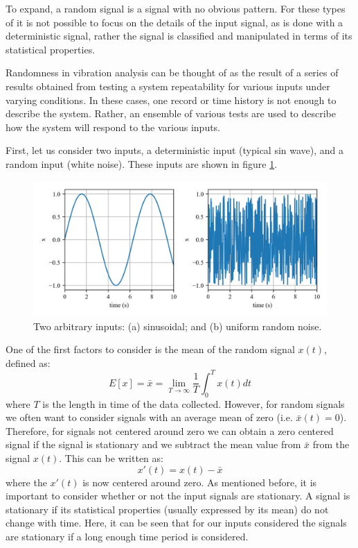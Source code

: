 \documentclass[12pt,letter]{article}
\begin{document}
To expand, a random signal is a signal with no obvious pattern. For these types of it is not possible to focus on the details of the input signal, as is done with a deterministic signal, rather the signal is classified and manipulated in terms of its statistical properties. 

Randomness in vibration analysis can be thought of as the result of a series of results obtained from testing a system repeatability for various inputs under varying conditions. In these cases, one record or time history is not enough to describe the system. Rather, an ensemble of various tests are used to describe how the system will respond to the various inputs. 

First, let us consider two inputs, a deterministic input (typical sin wave), and a random input (white noise). These inputs are shown in figure \ref{fig:Response_to_random_input_inputs}. 

\begin{figure}[H]
	\centering
	\includegraphics[width=1\textwidth]{../figures/Response_to_random_input_inputs.png}
	\caption{Two arbitrary inputs: (a) sinusoidal; and (b) uniform random noise.}
	\label{fig:Response_to_random_input_inputs}
\end{figure}

One of the first factors to consider is the mean of the random signal $x(t)$, defined as:
\begin{equation}
E[x] = \bar{x} = \lim\limits_{T \rightarrow \infty} \frac{1}{T} \int_{0}^{T}x(t)dt
\end{equation}
where $T$ is the length in time of the data collected. However, for random signals we often want to consider signals with an average mean of zero (i.e. $\bar{x}(t)=0$). Therefore, for signals not centered around zero we can obtain a zero centered signal if the signal is stationary and we subtract the mean value from $\bar{x}$ from the signal $x(t)$. This can be written as:
\begin{equation}
x'(t) = x(t) - \bar{x}
\end{equation} 
where the $x'(t)$ is now centered around zero. As mentioned before, it is important to consider whether or not the input signals are stationary. A signal is stationary if its statistical properties (usually expressed by its mean) do not change with time. Here, it can be seen that for our inputs considered the signals are stationary if a long enough time period is considered. 
\end{document}
